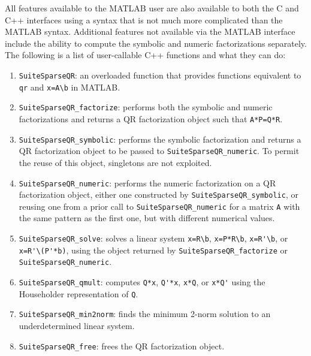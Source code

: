 \documentclass[12pt]{article}
\begin{document}

All features available to the MATLAB user are also available to both the C and
C++ interfaces using a syntax that is not much more complicated than the MATLAB
syntax.  Additional features not available via the MATLAB interface include the
ability to compute the symbolic and numeric factorizations separately.  The
following is a list of user-callable C++ functions and what they can do:

\begin{enumerate}

    \item \verb'SuiteSparseQR': an overloaded function that provides functions
    equivalent to \verb'qr' and \verb'x=A\b' in MATLAB.

    \item \verb'SuiteSparseQR_factorize': performs both the symbolic and
    numeric factorizations and returns a QR factorization object such that
    \verb'A*P=Q*R'.

    \item \verb'SuiteSparseQR_symbolic': performs the symbolic factorization
    and returns a QR factorization object to be passed to
    \verb'SuiteSparseQR_numeric'.  To permit the reuse of this object,
    singletons are not exploited.

    \item \verb'SuiteSparseQR_numeric': performs the numeric factorization on a
    QR factorization object, either one constructed by
    \verb'SuiteSparseQR_symbolic', or reusing one from a prior call to
    \verb'SuiteSparseQR_numeric' for a matrix \verb'A' with the same pattern as
    the first one, but with different numerical values.

    \item \verb'SuiteSparseQR_solve': solves a linear system \verb"x=R\b",
    \verb"x=P*R\b", \verb"x=R'\b", or \verb"x=R'\(P'*b)", using the object
    returned by \verb'SuiteSparseQR_factorize' or \newline
    \verb'SuiteSparseQR_numeric'.

    \item \verb'SuiteSparseQR_qmult': computes \verb"Q*x", \verb"Q'*x",
    \verb"x*Q", or \verb"x*Q'" using the Householder representation of
    \verb'Q'.

    \item \verb'SuiteSparseQR_min2norm': finds the minimum 2-norm solution to
    an under\-determined linear system.

    \item \verb'SuiteSparseQR_free': frees the QR factorization object.

\end{enumerate}
\end{document}
